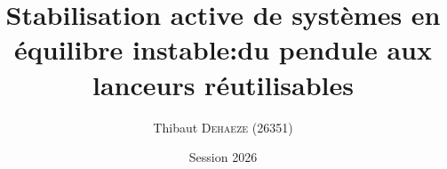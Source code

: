 \documentclass[9pt]{beamer}
\title[TIPE Pendule Inversé]{Stabilisation active de systèmes en équilibre instable:\newline du pendule aux lanceurs réutilisables}
\author{Thibaut \textsc{Dehaeze (26351)}} %
\institute[TIPE]{Épreuve de TIPE}
\date{Session 2026}
\begin{document}
\begin{frame}
\titlepage 
\end{frame}










\end{document}
